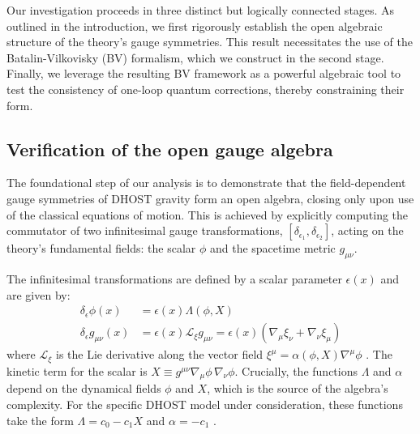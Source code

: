 \documentclass[twocolumn]{aastex631}
\begin{document}
Our investigation proceeds in three distinct but logically connected stages. As outlined in the introduction, we first rigorously establish the open algebraic structure of the theory's gauge symmetries. This result necessitates the use of the Batalin-Vilkovisky (BV) formalism, which we construct in the second stage. Finally, we leverage the resulting BV framework as a powerful algebraic tool to test the consistency of one-loop quantum corrections, thereby constraining their form.

\subsection{Verification of the open gauge algebra}
The foundational step of our analysis is to demonstrate that the field-dependent gauge symmetries of DHOST gravity form an open algebra, closing only upon use of the classical equations of motion. This is achieved by explicitly computing the commutator of two infinitesimal gauge transformations, $[\delta_{\epsilon_1}, \delta_{\epsilon_2}]$, acting on the theory's fundamental fields: the scalar $\phi$ and the spacetime metric $g_{\mu\nu}$.

The infinitesimal transformations are defined by a scalar parameter $\epsilon(x)$ and are given by:
\begin{align}
\delta_\epsilon \phi(x) &= \epsilon(x) \Lambda(\phi, X) \label{eq:transf_phi} \\
\delta_\epsilon g_{\mu\nu}(x) &= \epsilon(x) \mathcal{L}_{\xi} g_{\mu\nu} = \epsilon(x) (\nabla_\mu \xi_\nu + \nabla_\nu \xi_\mu) \label{eq:transf_g}
\end{align}
where $\mathcal{L}_{\xi}$ is the Lie derivative along the vector field $\xi^\mu = \alpha(\phi, X) \nabla^\mu \phi$ \citep{mukohyama2025bridgingdarkenergyblack}. The kinetic term for the scalar is $X \equiv g^{\mu\nu}\nabla_\mu\phi\,\nabla_\nu\phi$. Crucially, the functions $\Lambda$ and $\alpha$ depend on the dynamical fields $\phi$ and $X$, which is the source of the algebra's complexity. For the specific DHOST model under consideration, these functions take the form $\Lambda = c_0 - c_1 X$ and $\alpha = -c_1$ \citep{gao2019higherderivativescalartensortheory,takahashi2023invertibledisformaltransformationsarbitrary,michiwaki2026healthyscalartensortheoriesthirdorder}.
\end{document}

